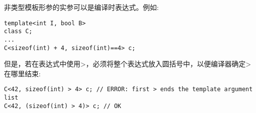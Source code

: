 非类型模板形参的实参可以是编译时表达式。例如:

\begin{lstlisting}[style=styleCXX]
template<int I, bool B>
class C;
...
C<sizeof(int) + 4, sizeof(int)==4> c;
\end{lstlisting}

但是，若在表达式中使用>，必须将整个表达式放入圆括号中，以便编译器确定>在哪里结束:

\begin{lstlisting}[style=styleCXX]
C<42, sizeof(int) > 4> c; // ERROR: first > ends the template argument list
C<42, (sizeof(int) > 4)> c; // OK
\end{lstlisting}











